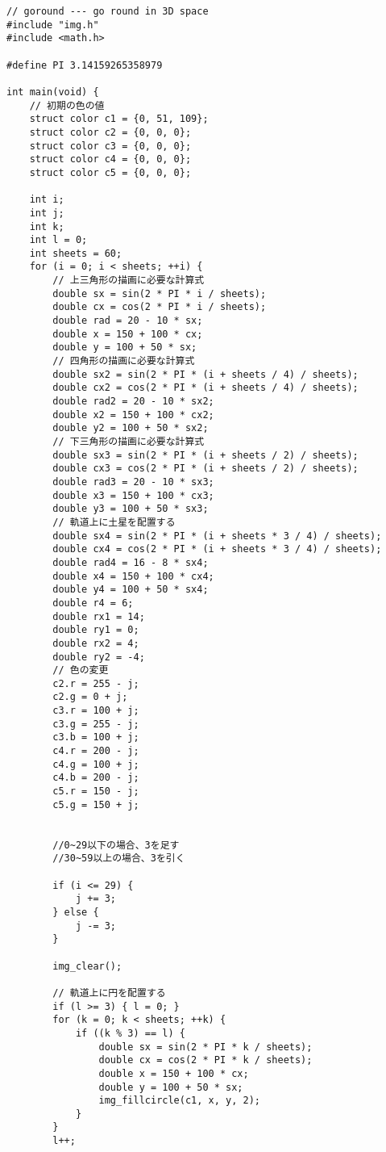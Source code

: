 \documentclass[12pt,a4j]{jarticle}
\begin{document}
\begin{verbatim}
// goround --- go round in 3D space
#include "img.h"
#include <math.h>

#define PI 3.14159265358979

int main(void) {
    // 初期の色の値
    struct color c1 = {0, 51, 109};
    struct color c2 = {0, 0, 0};
    struct color c3 = {0, 0, 0};
    struct color c4 = {0, 0, 0};
    struct color c5 = {0, 0, 0};

    int i;
    int j;
    int k;
    int l = 0;
    int sheets = 60;
    for (i = 0; i < sheets; ++i) {
        // 上三角形の描画に必要な計算式
        double sx = sin(2 * PI * i / sheets);
        double cx = cos(2 * PI * i / sheets);
        double rad = 20 - 10 * sx;
        double x = 150 + 100 * cx;
        double y = 100 + 50 * sx;
        // 四角形の描画に必要な計算式
        double sx2 = sin(2 * PI * (i + sheets / 4) / sheets);
        double cx2 = cos(2 * PI * (i + sheets / 4) / sheets);
        double rad2 = 20 - 10 * sx2;
        double x2 = 150 + 100 * cx2;
        double y2 = 100 + 50 * sx2;
        // 下三角形の描画に必要な計算式
        double sx3 = sin(2 * PI * (i + sheets / 2) / sheets);
        double cx3 = cos(2 * PI * (i + sheets / 2) / sheets);
        double rad3 = 20 - 10 * sx3;
        double x3 = 150 + 100 * cx3;
        double y3 = 100 + 50 * sx3;
        // 軌道上に土星を配置する
        double sx4 = sin(2 * PI * (i + sheets * 3 / 4) / sheets);
        double cx4 = cos(2 * PI * (i + sheets * 3 / 4) / sheets);
        double rad4 = 16 - 8 * sx4;
        double x4 = 150 + 100 * cx4;
        double y4 = 100 + 50 * sx4;
        double r4 = 6;
        double rx1 = 14;
        double ry1 = 0;
        double rx2 = 4;
        double ry2 = -4;
        // 色の変更
        c2.r = 255 - j;
        c2.g = 0 + j;
        c3.r = 100 + j;
        c3.g = 255 - j;
        c3.b = 100 + j;
        c4.r = 200 - j;
        c4.g = 100 + j;
        c4.b = 200 - j;
        c5.r = 150 - j;
        c5.g = 150 + j;


        //0~29以下の場合、3を足す
        //30~59以上の場合、3を引く

        if (i <= 29) {
            j += 3;
        } else {
            j -= 3;
        }

        img_clear();

        // 軌道上に円を配置する
        if (l >= 3) { l = 0; }
        for (k = 0; k < sheets; ++k) {
            if ((k % 3) == l) {
                double sx = sin(2 * PI * k / sheets);
                double cx = cos(2 * PI * k / sheets);
                double x = 150 + 100 * cx;
                double y = 100 + 50 * sx;
                img_fillcircle(c1, x, y, 2);
            }
        }
        l++;


\end{verbatim}
\end{document}
